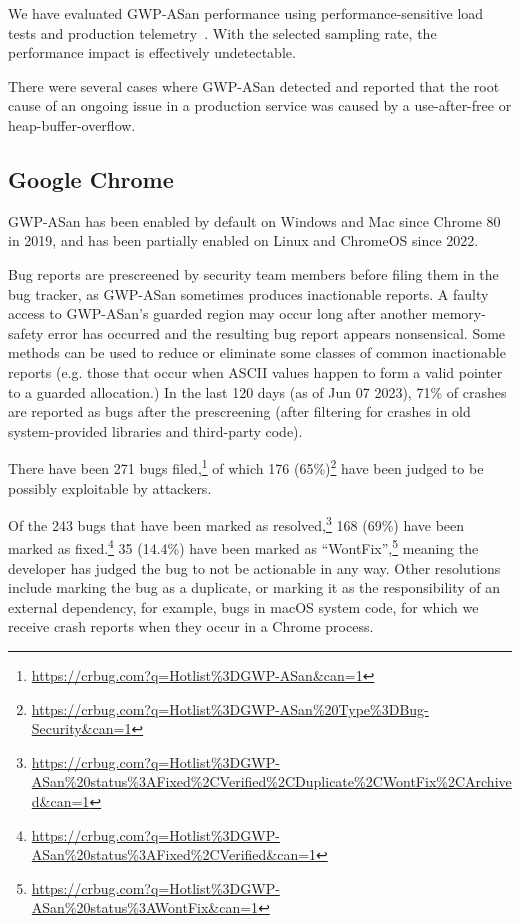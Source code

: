 We have evaluated GWP-ASan performance using performance-sensitive load tests
and production telemetry~\cite{RenTMSRH2010}.  With the selected sampling rate,
the performance impact is effectively undetectable.

There were several cases where GWP-ASan detected and reported that the root
cause of an ongoing issue in a production service was caused by a
use-after-free or heap-buffer-overflow.

\subsection{Google Chrome}

GWP-ASan has been enabled by default on Windows and Mac since Chrome 80 in
2019, and has been partially enabled on Linux and ChromeOS since 2022.

Bug reports are prescreened by security team members before filing them in the
bug tracker, as GWP-ASan sometimes produces inactionable reports. A faulty
access to GWP-ASan's guarded region may occur long after another memory-safety
error has occurred and the resulting bug report appears nonsensical. Some
methods can be used to reduce or eliminate some classes of common inactionable
reports (e.g. those that occur when ASCII values happen to form a valid
pointer to a guarded allocation.) In the last 120 days (as of Jun 07 2023),
71\% of crashes are reported as bugs after the prescreening (after filtering
for crashes in old system-provided libraries and third-party code).

There have been 271 bugs
filed,\footnote{\url{https://crbug.com?q=Hotlist\%3DGWP-ASan\&can=1}}
of which 176
(65\%)\footnote{\url{https://crbug.com?q=Hotlist\%3DGWP-ASan\%20Type\%3DBug-Security\&can=1}}
have been judged to be possibly exploitable by attackers.

Of the 243 bugs that have been marked as
resolved,\footnote{\url{https://crbug.com?q=Hotlist\%3DGWP-ASan\%20status\%3AFixed\%2CVerified\%2CDuplicate\%2CWontFix\%2CArchived\&can=1}}
168 (69\%) have been marked as
fixed.\footnote{\url{https://crbug.com?q=Hotlist\%3DGWP-ASan\%20status\%3AFixed\%2CVerified\&can=1}}
35 (14.4\%) have been marked as
``WontFix'',\footnote{\url{https://crbug.com?q=Hotlist\%3DGWP-ASan\%20status\%3AWontFix\&can=1}}
meaning the developer has judged the bug to not be actionable in any way. Other
resolutions include marking the bug as a duplicate, or marking it as the
responsibility of an external dependency, for example, bugs in macOS system
code, for which we receive crash reports when they occur in a Chrome process.

